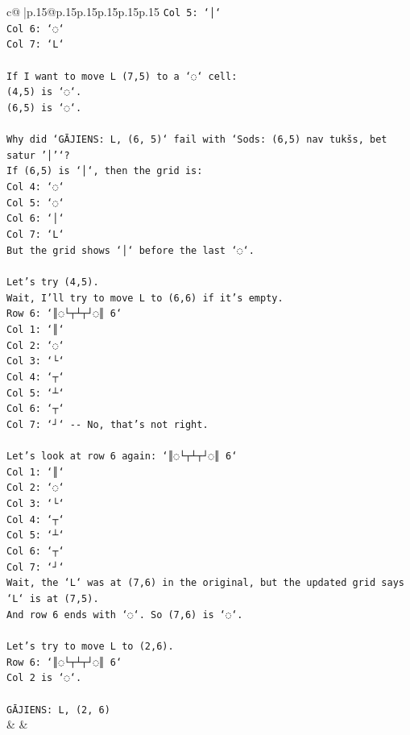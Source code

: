 \documentclass{article}
\begin{document}
{\begin{supertabular}{c@{$\;$}|p{.15\linewidth}@{}p{.15\linewidth}p{.15\linewidth}p{.15\linewidth}p{.15\linewidth}p{.15\linewidth}}
{{{\texttt{Col 5: `│`} \\
\texttt{Col 6: `◌`} \\
\texttt{Col 7: `L`} \\
\\ 
\texttt{If I want to move L (7,5) to a `◌` cell:} \\
\texttt{(4,5) is `◌`.} \\
\texttt{(6,5) is `◌`.} \\
\\ 
\texttt{Why did `GĀJIENS: L, (6, 5)` fail with `Sods: (6,5) nav tukšs, bet satur '│'`?} \\
\texttt{If (6,5) is `│`, then the grid is:} \\
\texttt{Col 4: `◌`} \\
\texttt{Col 5: `◌`} \\
\texttt{Col 6: `│`} \\
\texttt{Col 7: `L`} \\
\texttt{But the grid shows `│` before the last `◌`.} \\
\\ 
\texttt{Let's try (4,5).} \\
\texttt{Wait, I'll try to move L to (6,6) if it's empty.} \\
\texttt{Row 6: `║◌└┬┴┬┘◌║ 6`} \\
\texttt{Col 1: `║`} \\
\texttt{Col 2: `◌`} \\
\texttt{Col 3: `└`} \\
\texttt{Col 4: `┬`} \\
\texttt{Col 5: `┴`} \\
\texttt{Col 6: `┬`} \\
\texttt{Col 7: `┘` {-}{-} No, that's not right.} \\
\\ 
\texttt{Let's look at row 6 again: `║◌└┬┴┬┘◌║ 6`} \\
\texttt{Col 1: `║`} \\
\texttt{Col 2: `◌`} \\
\texttt{Col 3: `└`} \\
\texttt{Col 4: `┬`} \\
\texttt{Col 5: `┴`} \\
\texttt{Col 6: `┬`} \\
\texttt{Col 7: `┘`} \\
\texttt{Wait, the `L` was at (7,6) in the original, but the updated grid says `L` is at (7,5).} \\
\texttt{And row 6 ends with `◌`. So (7,6) is `◌`.} \\
\\ 
\texttt{Let's try to move L to (2,6).} \\
\texttt{Row 6: `║◌└┬┴┬┘◌║ 6`} \\
\texttt{Col 2 is `◌`.} \\
\\ 
\texttt{GĀJIENS: L, (2, 6)} \\
            }
        }
    }
    & & \\ \\


\end{supertabular}}
\end{document}
